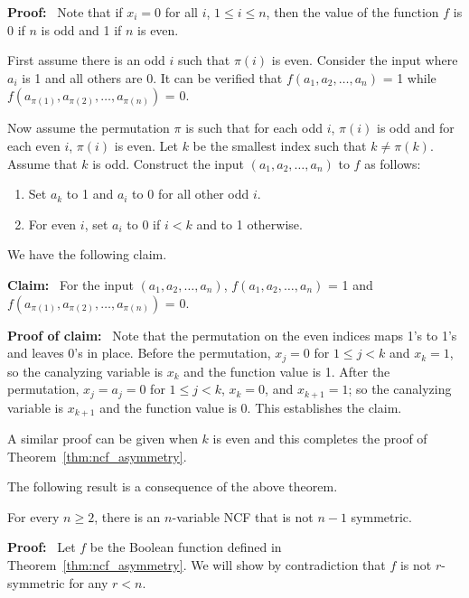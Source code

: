 \noindent
\textbf{Proof:}~ 
Note that if $x_i = 0$ for all $i$, $1 \leq i \leq n$, then the
value of the function $f$ is 0 if $n$ is odd and 1 if $n$ is even.

First assume there is an odd $i$ such that $\pi(i)$ is even. 
Consider the input where $a_i$ is 1 and all others are 0. 
It can be verified that $f(a_1, a_2, \ldots, a_n)$ = 1 while
$f(a_{\pi(1)}, a_{\pi(2)}, \ldots, a_{\pi(n)})$ = 0.

\smallskip
Now assume the permutation $\pi$ is such that for each odd $i$, $\pi(i)$ is odd 
and for each even $i$, $\pi(i)$ is even.
Let $k$ be the smallest index such that $k \neq \pi(k)$.
Assume that $k$  is odd. 
Construct the input $(a_1, a_2, \ldots,  a_n)$ to $f$ as follows: 
\begin{enumerate}
\item Set $a_k$ to 1 and $a_i$ to 0 for all other odd $i$. 
\item For even $i$, set $a_i$ to 0 if $i < k$ and to 1 otherwise. 
\end{enumerate}
We have the following claim.

\smallskip
\noindent
\textbf{Claim:}~ For the input $(a_1, a_2, \ldots, a_n)$, 
$f(a_1, a_2, \ldots, a_n)$ = 1 and
$f(a_{\pi(1)}, a_{\pi(2)}, \ldots, a_{\pi(n)})$ = 0.

\smallskip
\noindent
\textbf{Proof of claim:}~ Note that the permutation
on the even indices maps 1's to 1's and leaves 0's in place.  
Before the permutation,  
$x_j = 0$ for $1 \leq j < k$ and $x_k = 1$,
so the canalyzing variable is $x_k$ and the function value is 1.
After the permutation, 
$x_j = a_j = 0$ for $1 \leq j < k$,
$x_k = 0$, and $x_{k+1} = 1$;
so the canalyzing variable is $x_{k+1}$ and the function value is 0.
This establishes the claim. 

A similar proof can be given when $k$ is even and this completes
the proof of Theorem~\ref{thm:ncf_asymmetry}.
\QED

\noindent
The following result is a consequence of the above theorem.

\begin{corollary}\label{cor:ncf_not_rsymm}
For every $n \geq 2$, there is an $n$-variable NCF that is not $n-1$ symmetric.
\end{corollary}

\noindent
\textbf{Proof:}~ 
Let $f$ be the Boolean function defined in Theorem~\ref{thm:ncf_asymmetry}.
We will show by contradiction that $f$ is not $r$-symmetric for any $r < n$.

